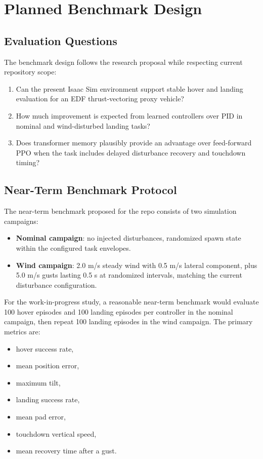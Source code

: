 \documentclass[10pt,twocolumn]{article}
\begin{document}
\section{Planned Benchmark Design}

\subsection{Evaluation Questions}

The benchmark design follows the research proposal while respecting current repository scope:
\begin{enumerate}
    \item Can the present Isaac Sim environment support stable hover and landing evaluation for an EDF thrust-vectoring proxy vehicle?
    \item How much improvement is expected from learned controllers over PID in nominal and wind-disturbed landing tasks?
    \item Does transformer memory plausibly provide an advantage over feed-forward PPO when the task includes delayed disturbance recovery and touchdown timing?
\end{enumerate}

\subsection{Near-Term Benchmark Protocol}

The near-term benchmark proposed for the repo consists of two simulation campaigns:
\begin{itemize}
    \item \textbf{Nominal campaign}: no injected disturbances, randomized spawn state within the configured task envelopes.
    \item \textbf{Wind campaign}: 2.0 m/s steady wind with 0.5 m/s lateral component, plus 5.0 m/s gusts lasting 0.5 s at randomized intervals, matching the current disturbance configuration.
\end{itemize}

For the work-in-progress study, a reasonable near-term benchmark would evaluate 100 hover episodes and 100 landing episodes per controller in the nominal campaign, then repeat 100 landing episodes in the wind campaign. The primary metrics are:
\begin{itemize}
    \item hover success rate,
    \item mean position error,
    \item maximum tilt,
    \item landing success rate,
    \item mean pad error,
    \item touchdown vertical speed,
    \item mean recovery time after a gust.
\end{itemize}
\end{document}
